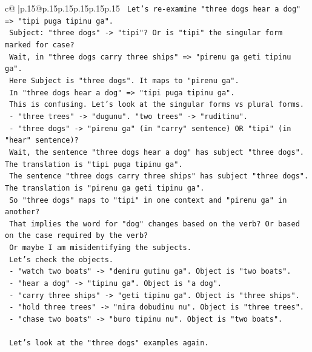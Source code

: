 \documentclass{article}
\begin{document}
{\begin{supertabular}{c@{$\;$}|p{.15\linewidth}@{}p{.15\linewidth}p{.15\linewidth}p{.15\linewidth}p{.15\linewidth}p{.15\linewidth}}
{{{\texttt{       Let's re{-}examine "three dogs hear a dog" => "tipi puga tipinu ga".} \\
\texttt{       Subject: "three dogs" {-}> "tipi"? Or is "tipi" the singular form marked for case?} \\
\texttt{       Wait, in "three dogs carry three ships" => "pirenu ga geti tipinu ga".} \\
\texttt{       Here Subject is "three dogs". It maps to "pirenu ga".} \\
\texttt{       In "three dogs hear a dog" => "tipi puga tipinu ga".} \\
\texttt{       This is confusing. Let's look at the singular forms vs plural forms.} \\
\texttt{       {-} "three trees" {-}> "dugunu". "two trees" {-}> "ruditinu".} \\
\texttt{       {-} "three dogs" {-}> "pirenu ga" (in "carry" sentence) OR "tipi" (in "hear" sentence)?} \\
\texttt{       Wait, the sentence "three dogs hear a dog" has subject "three dogs". The translation is "tipi puga tipinu ga".} \\
\texttt{       The sentence "three dogs carry three ships" has subject "three dogs". The translation is "pirenu ga geti tipinu ga".} \\
\texttt{       So "three dogs" maps to "tipi" in one context and "pirenu ga" in another?} \\
\texttt{       That implies the word for "dog" changes based on the verb? Or based on the case required by the verb?} \\
\texttt{       Or maybe I am misidentifying the subjects.} \\
\texttt{       Let's check the objects.} \\
\texttt{       {-} "watch two boats" {-}> "deniru gutinu ga". Object is "two boats".} \\
\texttt{       {-} "hear a dog" {-}> "tipinu ga". Object is "a dog".} \\
\texttt{       {-} "carry three ships" {-}> "geti tipinu ga". Object is "three ships".} \\
\texttt{       {-} "hold three trees" {-}> "nira dobudinu nu". Object is "three trees".} \\
\texttt{       {-} "chase two boats" {-}> "buro tipinu nu". Object is "two boats".} \\
\\ 
\texttt{       Let's look at the "three dogs" examples again.} \\
}}}
\end{supertabular}}
\end{document}
